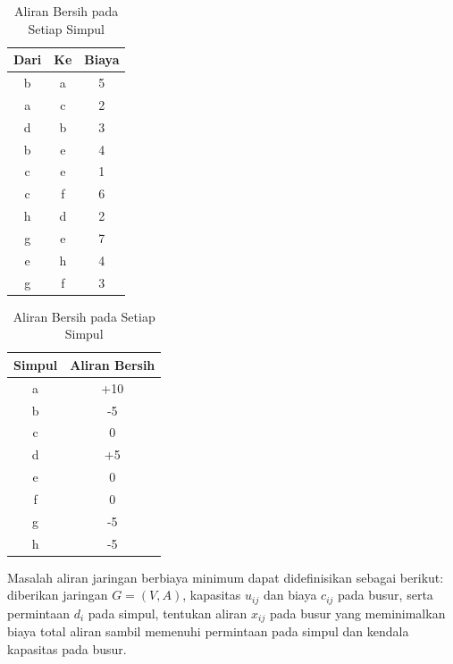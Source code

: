 \begin{table}[h]
    \centering
    \begin{minipage}{0.45\textwidth}
        \centering
        \begin{tabular}{|c|c|c|}
            \hline
            \textbf{Dari} & \textbf{Ke} & \textbf{Biaya} \\
            \hline
            b & a & {\color{red} 5 }\\
            a & c & {\color{red}2} \\
            d & b & {\color{red}3 }\\
            b & e & {\color{red}4 }\\
            c & e & {\color{red}1 }\\
            c & f & {\color{red}6 }\\
            h & d & {\color{red}2 }\\
            g & e & {\color{red}7 }\\
            e & h & {\color{red}4 }\\
            g & f & {\color{red}3} \\
            \hline
        \end{tabular}
        \caption{Biaya Busur dalam Masalah Aliran Jaringan}
        \label{tab:arc_costs}
    \end{minipage}
    \hfill
    \begin{minipage}{0.45\textwidth}
        \centering
        \begin{tabular}{|c|c|}
            \hline
            \textbf{Simpul} & \textbf{Aliran Bersih} \\
            \hline
            a & {\color{blue}+10} \\
            b & {\color{blue}-5} \\
            c & {\color{blue}0} \\
            d & {\color{blue}+5 }\\
            e & {\color{blue}0} \\
            f & {\color{blue}0} \\
            g & {\color{blue}-5} \\
            h & {\color{blue}-5} \\
            \hline
        \end{tabular}
        \caption{Aliran Bersih pada Setiap Simpul}
        \label{tab:net_flow}
    \end{minipage}
\end{table}
Masalah aliran jaringan berbiaya minimum dapat didefinisikan sebagai berikut: diberikan jaringan \( G = (V, A) \), kapasitas \( u_{ij} \) dan biaya \( c_{ij} \) pada busur, serta permintaan \( d_i \) pada simpul, tentukan aliran \( x_{ij} \) pada busur yang meminimalkan biaya total aliran sambil memenuhi permintaan pada simpul dan kendala kapasitas pada busur.


